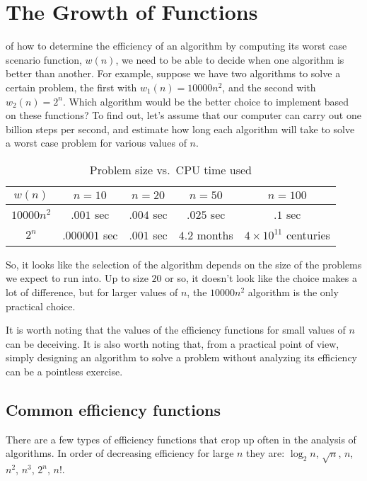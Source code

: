 \chapter{The Growth of Functions}

 of how to determine the efficiency of an algorithm by computing
its worst case scenario function, $w(n)$,  we need to be able to decide when one algorithm
is better than another. For example, suppose we have two algorithms to solve a certain
problem, the first with $w_1(n) = 10000n^2$, and the second with 
$w_2(n) = 2^n$.
Which algorithm would be the better choice to implement based on these functions?
To find out, let's assume that our computer can carry out one billion steps per second,
and estimate how long each algorithm will take to solve a worst case problem for various values
of $n$.
\begin{table}[h!t]
\centering
\begin{tabular}{ c  c  c  c  c }
\toprule
$w(n)$ & $n=10$ & $n=20$ & $n=50$ & $n=100$ \\
\midrule\addlinespace
$10000n^2$ & $.001$ sec & $.004$ sec & $.025$ sec & $.1$ sec \\
\addlinespace
$2^n$ &   $.000001$ sec & $.001$ sec & $4.2$ months & $4\times 10^{11}$ centuries  \\
\bottomrule
\end{tabular}
\caption{Problem size vs.~CPU time used}
\end{table}

So, it looks like the selection of the algorithm depends on the size of
the problems we expect to run into. Up to size $20$ or so, it doesn't
look like the choice makes a lot of difference, but for larger values of $n$,
the $10000n^2$ algorithm is the only practical choice. 

It is worth noting
that the values of the efficiency functions for small values of $n$
can be deceiving. It is also worth noting that, from a practical
point of view, simply designing an algorithm to solve a problem
without analyzing its efficiency can be a pointless exercise.

\section{Common efficiency functions}
There are a few types of efficiency functions that crop up
often in the analysis of algorithms. In order of decreasing
efficiency for large $n$ they are: $\log_2{n}$,
$\sqrt{n}$, $n$, $n^2$, $n^3$, $2^n$, $n!$.

